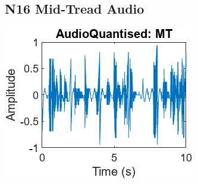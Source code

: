 \documentclass{article}
\begin{document}
\subsection{N16 Mid-Tread Audio}
\label{sec: N16MT}
\includegraphics{N16MT.png}
\end{document}
